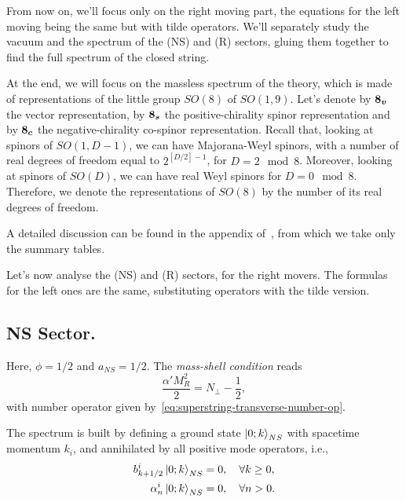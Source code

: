 From now on, we'll focus only on the right moving part, the equations for the left moving being the same but with tilde operators. We'll separately study the vacuum and the spectrum of the (NS) and (R) sectors, gluing them together to find the full spectrum of the closed string.

At the end, we will focus on the massless spectrum of the theory, which is made of representations of the little group $SO(8)$ of $SO(1,9)$. Let's denote by $\boldsymbol{8_v}$ the vector representation, by $\boldsymbol{8_s}$ the positive-chirality spinor representation and by $\boldsymbol{8_c}$ the negative-chirality co-spinor representation. Recall that, looking at spinors of $SO(1,D-1)$, we can have Majorana-Weyl spinors, with a number of real degrees of freedom equal to $2^{[{D}/{2}]-1}$, for $D = 2 \mod 8$. Moreover, looking at spinors of $SO(D)$, we can have real Weyl spinors for $D = 0 \mod 8$. Therefore, we denote the representations of $SO(8)$ by the number of its real degrees of freedom.

A detailed discussion can be found in the appendix of~\cite{polchisnki:superstrings}, from which we take only the summary tables.
\begin{equation}
    
\end{equation}
\begin{equation}
    
\end{equation}

Let's now analyse the (NS) and (R) sectors, for the right movers. The formulas for the left ones are the same, substituting operators with the tilde version.

\subsection{NS Sector.}
Here, $\phi = 1/2$ and $a_{NS} = 1/2$. The \emph{mass-shell condition} reads
\begin{equation}\label{eq:NS-mass-shell}
    \frac{\alpha' M^2_R}{2} = {N}_\perp - \frac{1}{2},
\end{equation}
with number operator given by~\eqref{eq:superstring-transverse-number-op}.

The spectrum is built by defining a ground state $\ket{0;k}_{NS}$ with spacetime momentum $k_i$, and annihilated by all positive mode operators, i.e.,
\begin{equation}
\begin{aligned}
    b^i_{k +1/2} \ket{0;k}_{NS} &= 0, \quad \forall k \geq 0, \\
    \alpha^i_n \ket{0;k}_{NS} &= 0, \quad \forall n > 0. \\
\end{aligned}
\end{equation}

